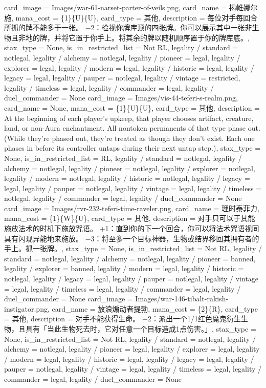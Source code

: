 \documentclass[lang = cn, color = black, 10pt]{AllThatStax}
\begin{document}
\card
{
	card_image = Images/war-61-narset-parter-of-veils.png,
	card_name = 揭帷娜尔施,
	mana_cost = \{1\}\{U\}\{U\},
	card_type = 其他,
	description = 每位对手每回合所抓的牌不能多于一张。
	−2：检视你牌库顶的四张牌。你可以展示其中一张非生物且非地的牌，并将它置于你手上。将其余的牌以随机顺序置于你的牌库底。,
	stax_type = None,
	is_in_restricted_list = Not RL,
	legality / standard = notlegal,
	legality / alchemy = notlegal,
	legality / pioneer = legal,
	legality / explorer = legal,
	legality / modern = legal,
	legality / historic = legal,
	legality / legacy = legal,
	legality / pauper = notlegal,
	legality / vintage = restricted,
	legality / timeless = legal,
	legality / commander = legal,
	legality / duel_commander = None
}
\card
{
	card_image = Images/vis-44-teferi-s-realm.png,
	card_name = None,
	mana_cost = \{1\}\{U\}\{U\},
	card_type = 其他,
	description = At the beginning of each player's upkeep, that player chooses artifact, creature, land, or non-Aura enchantment. All nontoken permanents of that type phase out. (While they're phased out, they're treated as though they don't exist. Each one phases in before its controller untaps during their next untap step.),
	stax_type = None,
	is_in_restricted_list = RL,
	legality / standard = notlegal,
	legality / alchemy = notlegal,
	legality / pioneer = notlegal,
	legality / explorer = notlegal,
	legality / modern = notlegal,
	legality / historic = notlegal,
	legality / legacy = legal,
	legality / pauper = notlegal,
	legality / vintage = legal,
	legality / timeless = notlegal,
	legality / commander = legal,
	legality / duel_commander = None
}
\card
{
	card_image = Images/rvr-232-teferi-time-raveler.png,
	card_name = 理时泰菲力,
	mana_cost = \{1\}\{W\}\{U\},
	card_type = 其他,
	description = 对手只可以于其能施放法术的时机下施放咒语。
	+1：直到你的下一个回合，你可以将法术咒语视同具有闪现异能地来施放。
	−3：将至多一个目标神器，生物或结界移回其拥有者的手上。抓一张牌。,
	stax_type = None,
	is_in_restricted_list = Not RL,
	legality / standard = notlegal,
	legality / alchemy = notlegal,
	legality / pioneer = banned,
	legality / explorer = banned,
	legality / modern = legal,
	legality / historic = notlegal,
	legality / legacy = legal,
	legality / pauper = notlegal,
	legality / vintage = legal,
	legality / timeless = legal,
	legality / commander = legal,
	legality / duel_commander = None
}
\card
{
	card_image = Images/war-146-tibalt-rakish-instigator.png,
	card_name = 放浪煽动者提勃,
	mana_cost = \{2\}\{R\},
	card_type = 其他,
	description = 对手不能获得生命。
	−2：派出一个1/1红色魔鬼衍生生物，且具有「当此生物死去时，它对任意一个目标造成1点伤害。」,
	stax_type = None,
	is_in_restricted_list = Not RL,
	legality / standard = notlegal,
	legality / alchemy = notlegal,
	legality / pioneer = legal,
	legality / explorer = legal,
	legality / modern = legal,
	legality / historic = legal,
	legality / legacy = legal,
	legality / pauper = notlegal,
	legality / vintage = legal,
	legality / timeless = legal,
	legality / commander = legal,
	legality / duel_commander = None
}
\end{document}
